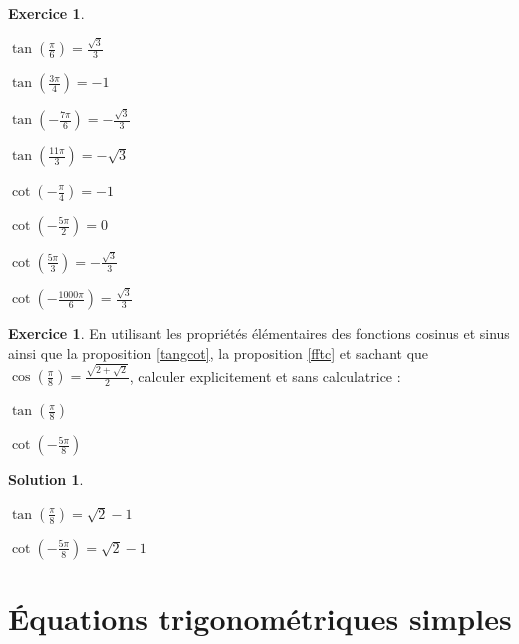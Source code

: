 \documentclass[a4paper,fontsize=13pt]{scrreprt}
\theoremstyle{plain}
\theoremstyle{definition}
\newtheorem{exo}[subsection]{Exercice}
\newtheorem*{solu}{Solution}
\begin{document}
\begin{exo}
~\\
\begin{enumerate}
\begin{multicols}{2}
\item $\tan(\frac{\pi}{6})=\frac{\sqrt{3}}{3}$
\item $\tan(\frac{3\pi}{4})=-1$
\item $\tan(-\frac{7\pi}{6})=-\frac{\sqrt{3}}{3}$
\item $\tan(\frac{11\pi}{3})=-\sqrt{3}$
\item $\cot(-\frac{\pi}{4})=-1$
\item $\cot(-\frac{5\pi}{2})=0$
\item $\cot(\frac{5\pi}{3})=-\frac{\sqrt{3}}{3}$
\item $\cot(-\frac{1000\pi}{6})=\frac{\sqrt{3}}{3}$
\end{multicols}
\end{enumerate}
\end{exo}

\begin{exo}
En utilisant les propriétés élémentaires des fonctions cosinus et sinus ainsi que la proposition \ref{tangcot}, la proposition \ref{fftc} et sachant que $\cos(\frac{\pi}{8}) = \frac{\sqrt{2+\sqrt{2}}}{2}$, calculer explicitement et sans calculatrice :
\begin{enumerate}
\begin{multicols}{2}
\item $\tan(\frac{\pi}{8})$
\item $\cot(-\frac{5\pi}{8})$
\end{multicols}
\end{enumerate}
\end{exo}

\begin{solu}
~\\
\begin{enumerate}
\begin{multicols}{2}
\item $\tan(\frac{\pi}{8})=\sqrt{2}-1$
\item $\cot(-\frac{5\pi}{8})=\sqrt{2}-1$
\end{multicols}
\end{enumerate}
\end{solu}

\chapter{\'Equations trigonométriques simples}
\end{document}

